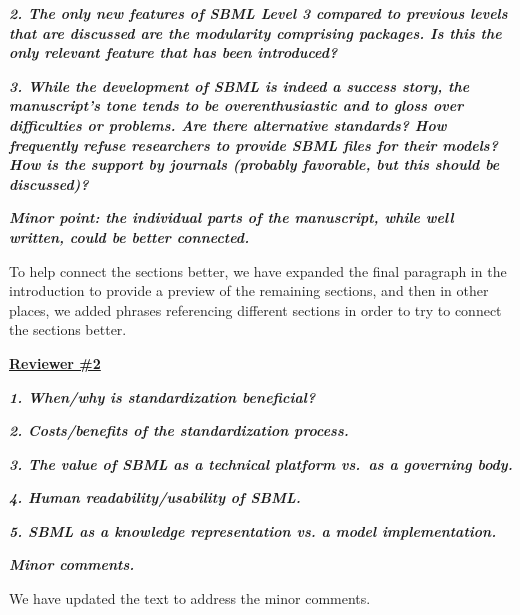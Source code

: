 \documentclass[11pt]{mhletter}
\begin{document}
\textbf{\textit{2. The only new features of SBML Level 3 compared to previous levels that are discussed are the modularity comprising packages. Is this the only relevant feature that has been introduced?}}


\textbf{\textit{3. While the development of SBML is indeed a success story, the manuscript's tone tends to be overenthusiastic and to gloss over difficulties or problems. Are there alternative standards? How frequently refuse researchers to provide SBML files for their models? How is the support by journals (probably favorable, but this should be discussed)?}}


\textbf{\textit{Minor point: the individual parts of the manuscript, while well written, could be better connected.}}

To help connect the sections better, we have expanded the final paragraph in the introduction to provide a preview of the remaining sections, and then in other places, we added phrases referencing different sections in order to try to connect the sections better.


\clearpage
\textbf{\underline{Reviewer \#2}}

\textbf{\textit{1. When/why is standardization beneficial?}}


\textbf{\textit{2. Costs/benefits of the standardization process.}}


\textbf{\textit{3. The value of SBML as a technical platform vs.\ as a governing body.}}


\textbf{\textit{4. Human readability/usability of SBML.}}


\textbf{\textit{5. SBML as a knowledge representation vs. a model implementation.}}


\textbf{\textit{Minor comments.}}

We have updated the text to address the minor comments.
\end{document}
